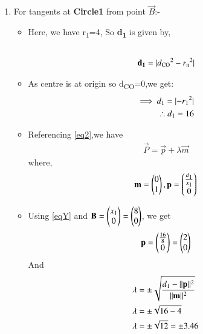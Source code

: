 \documentclass[journal,12pt,twocolumn]{IEEEtran}
\begin{document}
\begin{enumerate}
\begin{proof}
\begin{itemize}
\begin{align}
\lambda^2&=\frac{d^2-\norm{\vec{n}}^2}{\norm{\vec{m}}^2}
\\
\lambda &= \pm \sqrt{\frac{d^2-\norm{\vec{n}}^2}{\norm{\vec{m}}^2}} 
\end{align}
\end{itemize}
\end{proof}
\item For tangents at \textbf{Circle1} from point $\vec{B}$:-
\begin{itemize}
\item Here, we have r\textsubscript{1}=4, So \textbf{d\textsubscript{1}} is given by,
\begin{align}
 \\
 \textbf{d\textsubscript{1}} = \lvert d\textsubscript{CO}^2-r\textsubscript{n}^2\vert
 \end{align}
\item  As  centre is at origin so d\textsubscript{CO}=0,we get:
\begin{align}
 \implies d\textsubscript{1}=\lvert-r\textsubscript{1}^2\vert 
 \\
  \therefore  d\textsubscript{1}=16 \label{eqY}
\end{align}
\item Referencing \eqref{eq2},we have
\begin{align}
 \vec{P}=\vec{p}+\lambda \vec{m}   \label{eqa}
\end{align}
where,
\begin{align}
 \mathbf{m}=\begin{pmatrix}0\\1\end{pmatrix},\mathbf{p}=\begin{pmatrix}\frac{d\textsubscript{1}}{x\textsubscript{1}}\\0\end{pmatrix}
 \end{align}
 \item Using \eqref{eqY} and $\mathbf{B}=\begin{pmatrix}x\textsubscript{1}\\0\end{pmatrix}=\begin{pmatrix}8\\0\end{pmatrix}$, we get 
 \begin{align}
 \mathbf{p}=\begin{pmatrix}\frac{16}{8}\\0\end{pmatrix}=\begin{pmatrix}2\\0\end{pmatrix}
\end{align}
And
\begin{align}
\lambda &= \pm\sqrt{\frac{d\textsubscript{1}-\lVert\mathbf{p}\rVert^2}{\lVert\mathbf{m}\rVert^2}}
\\
\lambda &= \pm\sqrt{16-4}
\\
\lambda &= \pm\sqrt{12}=\pm 3.46
\end{align}
\end{itemize}

\end{enumerate}
\end{document}
